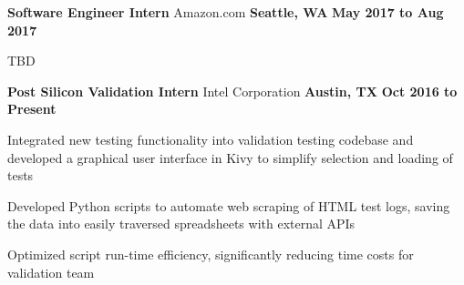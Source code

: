 \begin{cventries}
  \cventry
    {\normalsize \textbf{Software Engineer Intern}}
    {\large Amazon.com}
    {\normalsize \textbf{Seattle, WA}}
    {\normalsize \textbf{May 2017 to Aug 2017}}
    {
      \begin{cvitems}
        \item {\normalsize TBD}
      \end{cvitems}
    }
  \cventry
    {\normalsize \textbf{Post Silicon Validation Intern}}
    {\large Intel Corporation}
    {\normalsize \textbf{Austin, TX}}
    {\normalsize \textbf{Oct 2016 to Present}}
    {
      \begin{cvitems}
        \item {\normalsize Integrated new testing functionality into validation testing codebase and developed a graphical user interface in Kivy to simplify selection and loading of tests}
        \item {\normalsize Developed Python scripts to automate web scraping of HTML test logs, saving the data into easily traversed spreadsheets with external APIs}
        \item {\normalsize Optimized script run-time efficiency, significantly reducing time costs for validation team}
      \end{cvitems}
    }
\end{cventries}
